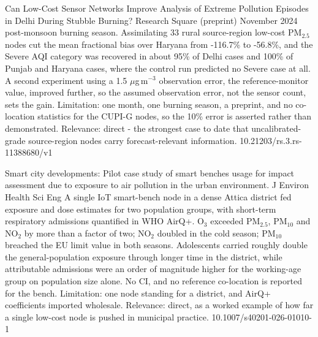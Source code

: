 \documentclass[10pt]{article}
\begin{document}
\par{}\baselineskip{}\baselineskip
{}

{Can Low-Cost Sensor Networks Improve Analysis of Extreme Pollution Episodes in Delhi During Stubble Burning?}
{Research Square (preprint)}
{November 2024 post-monsoon burning season. Assimilating 33 rural source-region low-cost PM$_{2.5}$ nodes cut the mean fractional bias over Haryana from -116.7\% to -56.8\%, and the Severe AQI category was recovered in about 95\% of Delhi cases and 100\% of Punjab and Haryana cases, where the control run predicted no Severe case at all. A second experiment using a 1.5 $\mu$g\,m$^{-3}$ observation error, the reference-monitor value, improved further, so the assumed observation error, not the sensor count, sets the gain. Limitation: one month, one burning season, a preprint, and no co-location statistics for the CUPI-G nodes, so the 10\% error is asserted rather than demonstrated. Relevance: direct - the strongest case to date that uncalibrated-grade source-region nodes carry forecast-relevant information.}
{10.21203/rs.3.rs-11388680/v1}

{Smart city developments: Pilot case study of smart benches usage for impact assessment due to exposure to air pollution in the urban environment.}
{J Environ Health Sci Eng}
{A single IoT smart-bench node in a dense Attica district fed exposure and dose estimates for two population groups, with short-term respiratory admissions quantified in WHO AirQ+. O$_3$ exceeded PM$_{2.5}$, PM$_{10}$ and NO$_2$ by more than a factor of two; NO$_2$ doubled in the cold season; PM$_{10}$ breached the EU limit value in both seasons. Adolescents carried roughly double the general-population exposure through longer time in the district, while attributable admissions were an order of magnitude higher for the working-age group on population size alone. No CI, and no reference co-location is reported for the bench. Limitation: one node standing for a district, and AirQ+ coefficients imported wholesale. Relevance: direct, as a worked example of how far a single low-cost node is pushed in municipal practice.}
{10.1007/s40201-026-01010-1}
\end{document}
